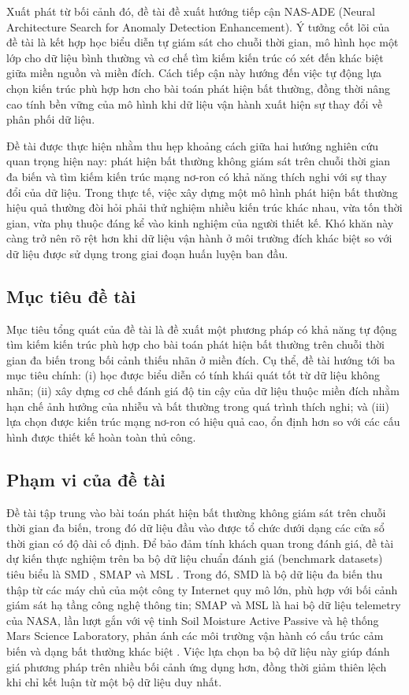 \documentclass[a4paper]{article}
\begin{document}
Xuất phát từ bối cảnh đó, đề tài đề xuất hướng tiếp cận NAS-ADE (Neural Architecture Search for Anomaly Detection Enhancement). Ý tưởng cốt lõi của đề tài là kết hợp học biểu diễn tự giám sát cho chuỗi thời gian, mô hình học một lớp cho dữ liệu bình thường và cơ chế tìm kiếm kiến trúc có xét đến khác biệt giữa miền nguồn và miền đích. Cách tiếp cận này hướng đến việc tự động lựa chọn kiến trúc phù hợp hơn cho bài toán phát hiện bất thường, đồng thời nâng cao tính bền vững của mô hình khi dữ liệu vận hành xuất hiện sự thay đổi về phân phối dữ liệu.

Đề tài được thực hiện nhằm thu hẹp khoảng cách giữa hai hướng nghiên cứu quan trọng hiện nay: phát hiện bất thường không giám sát trên chuỗi thời gian đa biến và tìm kiếm kiến trúc mạng nơ-ron có khả năng thích nghi với sự thay đổi của dữ liệu. Trong thực tế, việc xây dựng một mô hình phát hiện bất thường hiệu quả thường đòi hỏi phải thử nghiệm nhiều kiến trúc khác nhau, vừa tốn thời gian, vừa phụ thuộc đáng kể vào kinh nghiệm của người thiết kế. Khó khăn này càng trở nên rõ rệt hơn khi dữ liệu vận hành ở môi trường đích khác biệt so với dữ liệu được sử dụng trong giai đoạn huấn luyện ban đầu.

\subsection{Mục tiêu đề tài}

Mục tiêu tổng quát của đề tài là đề xuất một phương pháp có khả năng tự động tìm kiếm kiến trúc phù hợp cho bài toán phát hiện bất thường trên chuỗi thời gian đa biến trong bối cảnh thiếu nhãn ở miền đích. Cụ thể, đề tài hướng tới ba mục tiêu chính: (i) học được biểu diễn có tính khái quát tốt từ dữ liệu không nhãn; (ii) xây dựng cơ chế đánh giá độ tin cậy của dữ liệu thuộc miền đích nhằm hạn chế ảnh hưởng của nhiễu và bất thường trong quá trình thích nghi; và (iii) lựa chọn được kiến trúc mạng nơ-ron có hiệu quả cao, ổn định hơn so với các cấu hình được thiết kế hoàn toàn thủ công.

\subsection{Phạm vi của đề tài}

Đề tài tập trung vào bài toán phát hiện bất thường không giám sát trên chuỗi thời gian đa biến, trong đó dữ liệu đầu vào được tổ chức dưới dạng các cửa sổ thời gian có độ dài cố định. Để bảo đảm tính khách quan trong đánh giá, đề tài dự kiến thực nghiệm trên ba bộ dữ liệu chuẩn đánh giá (benchmark datasets) tiêu biểu là SMD \cite{omnianomaly}, SMAP \cite{spacecraft} và MSL \cite{spacecraft}. Trong đó, SMD là bộ dữ liệu đa biến thu thập từ các máy chủ của một công ty Internet quy mô lớn, phù hợp với bối cảnh giám sát hạ tầng công nghệ thông tin; SMAP và MSL là hai bộ dữ liệu telemetry của NASA, lần lượt gắn với vệ tinh Soil Moisture Active Passive và hệ thống Mars Science Laboratory, phản ánh các môi trường vận hành có cấu trúc cảm biến và dạng bất thường khác biệt \cite{spacecraft}. Việc lựa chọn ba bộ dữ liệu này giúp đánh giá phương pháp trên nhiều bối cảnh ứng dụng hơn, đồng thời giảm thiên lệch khi chỉ kết luận từ một bộ dữ liệu duy nhất.
\end{document}
